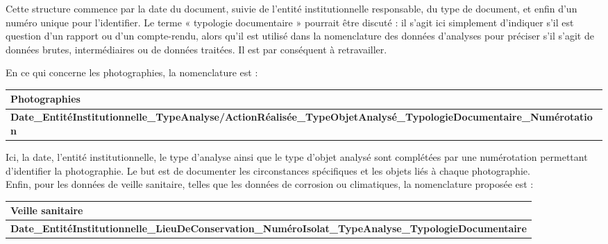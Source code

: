  Cette structure commence par la date du document, suivie de l'entité institutionnelle responsable, du type de document, et enfin d'un numéro unique pour l'identifier. Le terme « typologie documentaire » pourrait être discuté : il s’agit ici simplement d’indiquer s’il est question d’un rapport ou d’un compte-rendu, alors qu’il est utilisé dans la nomenclature des données d’analyses pour préciser s’il s’agit de données brutes, intermédiaires ou de données traitées. Il est par conséquent à retravailler.

En ce qui concerne les photographies, la nomenclature est :\\ 

\begin{center}
\begin{adjustbox}{width=0.85\textwidth} 
\begin{tabularx}{\textwidth}{|X|}
\hline
\textbf{Photographies} \\ \hline
\textbf{Date\_EntitéInstitutionnelle\_TypeAnalyse/ActionRéalisée\_TypeObjet\linebreak Analysé\_TypologieDocumentaire\_Numérotation} \\ \hline
\end{tabularx}
\end{adjustbox}
\end{center}

Ici, la date, l'entité institutionnelle, le type d’analyse ainsi que le type d’objet analysé sont complétées par une numérotation permettant d’identifier la photographie. Le but est de documenter les circonstances spécifiques et les objets liés à chaque photographie.\\

Enfin, pour les données de veille sanitaire, telles que les données de corrosion ou climatiques, la nomenclature proposée est :\\ 

\begin{center}
\begin{adjustbox}{width=0.85\textwidth} 
\begin{tabularx}{\textwidth}{|X|}
\hline
\textbf{Veille sanitaire} \\ \hline
\textbf{Date\_EntitéInstitutionnelle\_LieuDeConservation\_NuméroIsolat\linebreak \_TypeAnalyse\_TypologieDocumentaire} \\ \hline
\end{tabularx}
\end{adjustbox}
\end{center}

